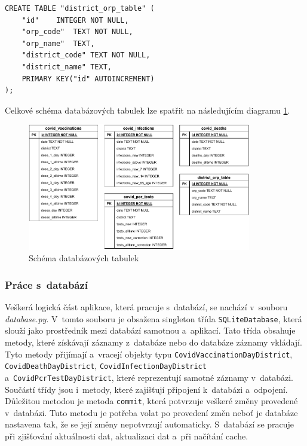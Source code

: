 \begin{lstlisting}[style=enhancedSQL,label=src:SQliteCreateORP,caption={Vytvoření SQLite tabulky pro zařazení ORP do okresů}]
CREATE TABLE "district_orp_table" (
	"id"	INTEGER NOT NULL,
	"orp_code"	TEXT NOT NULL,
	"orp_name"	TEXT,
	"district_code"	TEXT NOT NULL,
	"district_name"	TEXT,
	PRIMARY KEY("id" AUTOINCREMENT)
);
\end{lstlisting}

Celkové schéma databázových tabulek lze spatřit na následujícím diagramu \ref{fig:EntityRelationshipDiagram}.

\vspace*{0.5in}

\begin{figure}[h]
	\centering
	\includegraphics[width=0.87\textwidth]{Pictures/entity.pdf}
	\caption{Schéma databázových tabulek}
	\label{fig:EntityRelationshipDiagram}
\end{figure}

\subsubsection*{Práce s~databází}

Veškerá logická část aplikace, která pracuje s~databází, se nachází v~souboru \emph{database.py}. V~tomto souboru je obsažena singleton třída \lstinline{SQLiteDatabase}, která slouží jako prostředník mezi databází samotnou a~aplikací. Tato třída obsahuje metody, které získávají záznamy z~databáze nebo do databáze záznamy vkládají. Tyto metody přijímají a~vracejí objekty typu \lstinline{CovidVaccinationDayDistrict}, \lstinline{CovidDeathDayDistrict}, \lstinline{CovidInfectionDayDistrict} a~\lstinline{CovidPcrTestDayDistrict}, které reprezentují samotné záznamy v~databázi. Součástí třídy jsou i~metody, které zajišťují připojení k~databázi a~odpojení. Důležitou metodou je metoda \lstinline{commit}, která potvrzuje veškeré změny provedené v~databázi. Tuto metodu je potřeba volat po provedení změn neboť je databáze nastavena tak, že se její změny nepotvrzují automaticky. S~databází se pracuje při zjišťování aktuálnosti dat, aktualizaci dat a~při načítání cache.

